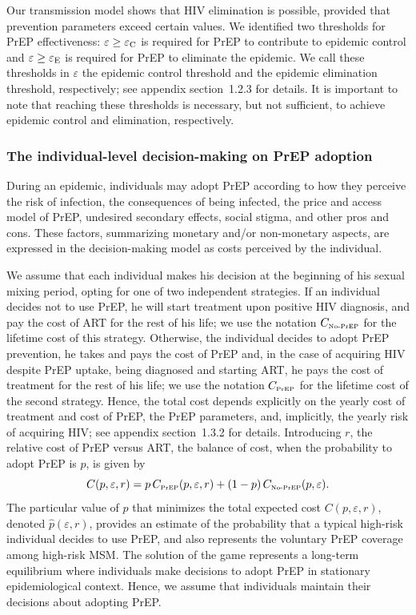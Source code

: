 \documentclass[preprint,review,12pt]{article}			%
\begin{document}
Our transmission model shows that HIV elimination is possible, provided that prevention parameters exceed certain values. We identified two thresholds for PrEP effectiveness: $\varepsilon \geq \varepsilon_{\rm C}$ is required for PrEP to contribute to epidemic control and $\varepsilon \geq \varepsilon_{\rm E}$ is required for PrEP to eliminate the epidemic. We call these thresholds in $\varepsilon$ the epidemic control threshold and the epidemic elimination threshold, respectively; see appendix section~1.2.3 for details. It is important to note that reaching these thresholds is necessary, but not sufficient, to achieve epidemic control and elimination, respectively. 


\subsubsection{The individual-level decision-making on PrEP adoption} \label{subsec:DecisionModel}

During an epidemic, individuals may adopt PrEP according to how they perceive the risk of infection,\cite{Bull2018} the consequences of being infected, the price and access model of PrEP,\cite{Gilson2018} undesired secondary effects,\cite{Thomann2017} social stigma,\cite{Brooks2019} and other pros and cons. These factors, summarizing monetary and/or non-monetary aspects, are expressed in the decision-making model as costs perceived by the individual. 

We assume that each individual makes his decision at the beginning of his sexual mixing period, opting for one of two independent strategies. If an individual decides not to use PrEP, he will start treatment upon positive HIV diagnosis, and pay the cost of ART for the rest of his life; we use the notation $C_{\text{\tiny No-PrEP}}$ for the lifetime cost of this strategy. Otherwise, the individual decides to adopt PrEP prevention, he takes and pays the cost of PrEP and, in the case of acquiring HIV despite PrEP uptake, being diagnosed and starting ART, he pays the cost of treatment for the rest of his life; we use the notation $C_{\text{\tiny PrEP}}$ for the lifetime cost of the second strategy. Hence, the total cost depends explicitly on the yearly cost of treatment and cost of PrEP, the PrEP parameters, and, implicitly, the yearly risk of acquiring HIV; see appendix section~1.3.2 for details. Introducing $r$, the relative cost of PrEP versus ART, the balance of cost, when the probability to adopt PrEP is $p$, is given by 
\begin{equation} \label{eq:C}
	C(p,\varepsilon, r) = p \, C_{\text{\tiny PrEP}}(p,\varepsilon, r) + (1- p) \, C_{\text{\tiny No-PrEP}}(p,\varepsilon).
\end{equation}
The particular value of $p$ that minimizes the total expected cost $C(p,\varepsilon, r)$, denoted $\hat{p}(\varepsilon, r)$, provides an estimate of the probability that a typical high-risk individual decides to use PrEP, and also represents the voluntary PrEP coverage among high-risk MSM. The solution of the game represents a long-term equilibrium where individuals make decisions to adopt PrEP in stationary epidemiological context. Hence, we assume that individuals maintain their decisions about adopting PrEP.
\end{document}
